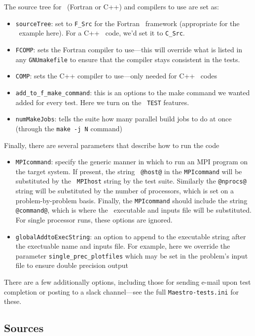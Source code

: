 The source tree for \boxlib\ (Fortran or C++) and compilers to use are set
as:
\begin{itemize}
\item {\tt sourceTree}: set to {\tt F\_Src} for the Fortran
  \boxlib\ framework (appropriate for the \maestro\ example here). For
  a C++ \boxlib\ code, we'd set it to {\tt C\_Src}.
\item {\tt FCOMP}: sets the Fortran compiler to use---this will
  override what is listed in any {\tt GNUmakefile} to ensure that the
  compiler stays consistent in the tests.
\item {\tt COMP}: sets the C++ compiler to use---only needed for C++
  \boxlib\ codes
\item {\tt add\_to\_f\_make\_command}: this is an options to the make
  command we wanted added for every test.  Here we turn on the
  \boxlib\ {\tt TEST} features.
\item {\tt numMakeJobs}: tells the suite how many parallel build
  jobs to do at once (through the {\tt make -j N} command)
\end{itemize}

Finally, there are several parameters that describe how to run the code
\begin{itemize}
\item {\tt MPIcommand}: specify the generic manner in which to run an
  MPI program on the target system.  If present, the string {\tt
    @host@} in the {\tt MPIcommand} will be substituted by the {\tt
    MPIhost} string by the test suite.  Similarly the {\tt @nprocs@}
  string will be substituted by the number of processors, which is set
  on a problem-by-problem basis.  Finally, the {\tt MPIcommand} should
  include the string {\tt @command@}, which is where the
  \maestro\ executable and inputs file will be substituted.  For
  single processor runs, these options are ignored.
\item {\tt globalAddtoExecString}: an option to append to the
  executable string after the exectuable name and inputs file.  For
  example, here we override the parameter {\tt single\_prec\_plotfiles}
  which may be set in the problem's input file to ensure double
  precision output
\end{itemize}

There are a few additionally options, including those for sending
e-mail upon test completion or posting to a slack channel---see the full {\tt Maestro-tests.ini} for these.

\subsection{Sources}

